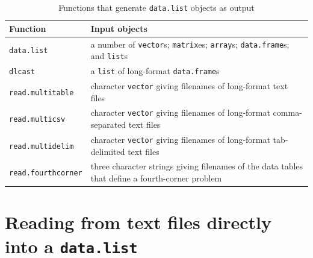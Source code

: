 \documentclass{article}
\newcommand{\R}{{\sf R}}
\newcommand{\code}[1]{\texttt{#1}}
\numberwithin{exercise}{section}
\begin{document}
\begin{table}
\caption{Functions that generate \code{data.list} objects as output}
\begin{center}
\begin{tabular}{p{3cm}p{8cm}}
\hline
Function & Input objects \\
\hline
\code{data.list} & a number of \code{vector}s; \code{matrix}es; \code{array}s; \code{data.frame}s; and \code{list}s \\
\code{dlcast} & a \code{list} of long-format \code{data.frame}s \\
\code{read.multitable} & character \code{vector} giving filenames of long-format text files \\
\code{read.multicsv} & character \code{vector} giving filenames of long-format comma-separated text files \\
\code{read.multidelim} & character \code{vector} giving filenames of long-format tab-delimited text files \\
\code{read.fourthcorner} & three character strings giving filenames of the data tables that define a fourth-corner problem \\
\hline
\end{tabular}
\end{center}
\label{tab:functions}
\end{table}


\section{Reading from text files directly into a \code{data.list}}
\end{document}
